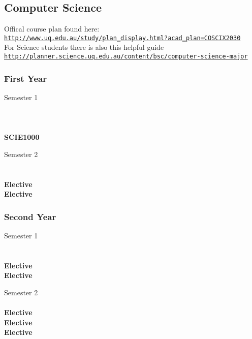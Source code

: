 \subsection{Computer Science}

Offical course plan found here: \\
\href{http://www.uq.edu.au/study/plan_display.html?acad_plan=COSCIX2030}{\nolinkurl{http://www.uq.edu.au/study/plan_display.html?acad_plan=COSCIX2030}} \\

For Science students there is also this helpful guide \\ 
\href{http://planner.science.uq.edu.au/content/bsc/computer-science-major}{\nolinkurl{http://planner.science.uq.edu.au/content/bsc/computer-science-major}}

\subsubsection{First Year}
\begin{center}
\begin{multicols}{2}
Semester 1 \\
 \\
 \\
 \\
\textbf{SCIE1000} \\
\vfill
\columnbreak

Semester 2 \\
 \\
 \\
\textbf{Elective} \\
\textbf{Elective} \\
\end{multicols}
\end{center}

\subsubsection{Second Year}
\begin{center}
\begin{multicols}{2}
Semester 1 \\
 \\
 \\
\textbf{Elective} \\
\textbf{Elective} \\
\vfill
\columnbreak

Semester 2 \\
 \\
\textbf{Elective} \\
\textbf{Elective} \\
\textbf{Elective} \\
\end{multicols}
\end{center}

